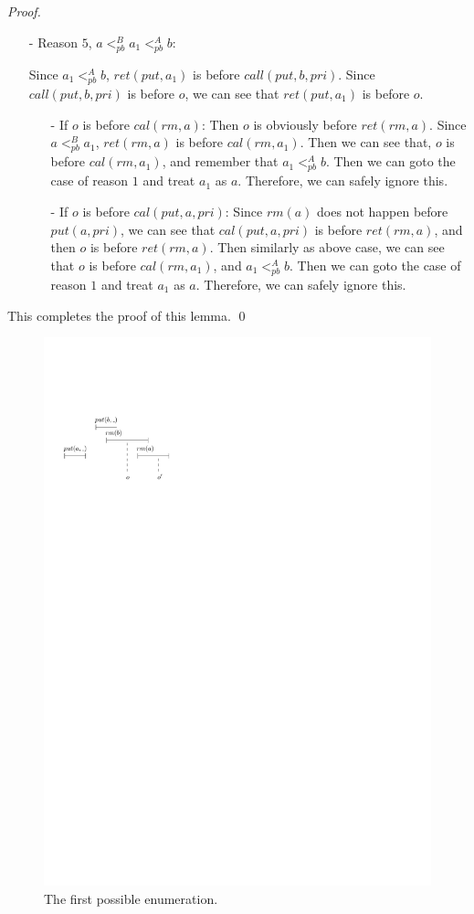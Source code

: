 \begin {proof}
\begin{itemize}
\item[-] Reason $5$, $a <_{\textit{pb}}^B a_1 <_{\textit{pb}}^A b$:

    Since $a_1 <_{\textit{pb}}^A b$, $\textit{ret}(\textit{put},a_1)$ is before $\textit{call}(\textit{put},b,\textit{pri})$. Since $\textit{call}(\textit{put},b,\textit{pri})$ is before $o$, we can see that $\textit{ret}(\textit{put},a_1)$ is before $o$.

    \begin{itemize}
    \setlength{\itemsep}{0.5pt}
    \item[-] If $o$ is before $\textit{cal}(\textit{rm},a)$: Then $o$ is obviously before $\textit{ret}(\textit{rm},a)$. Since $a <_{\textit{pb}}^B a_1$, $\textit{ret}(\textit{rm},a)$ is before $\textit{cal}(\textit{rm},a_1)$. Then we can see that, $o$ is before $\textit{cal}(\textit{rm},a_1)$, and remember that $a_1 <_{\textit{pb}}^A b$. Then we can goto the case of reason $1$ and treat $a_1$ as $a$. Therefore, we can safely ignore this.

    \item[-] If $o$ is before $\textit{cal}(\textit{put},a,\textit{pri})$: Since $\textit{rm}(a)$ does not happen before $\textit{put}(a,\textit{pri})$, we can see that $\textit{cal}(\textit{put},a,\textit{pri})$ is before $\textit{ret}(\textit{rm},a)$, and then $o$ is before $\textit{ret}(\textit{rm},a)$. Then similarly as above case, we can see that $o$ is before $\textit{cal}(\textit{rm},a_1)$, and $a_1 <_{\textit{pb}}^A b$. Then we can goto the case of reason $1$ and treat $a_1$ as $a$. Therefore, we can safely ignore this.
    \end{itemize}
\end{itemize}

This completes the proof of this lemma. \qed
\end {proof}

\begin{figure}[htbp]
  \centering
  \includegraphics[width=0.4 \textwidth]{figures/PIC-HIS-PQ1Equal-1.pdf}
  \caption{The first possible enumeration.}
  \label{fig:history enumeration 1 for PQ1Equal}
\end{figure}


